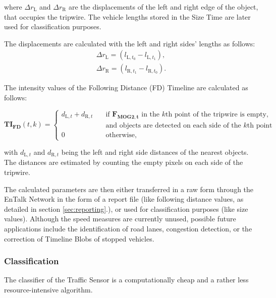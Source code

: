 where $\Delta r_{\text{L}}$ and $\Delta r_{\text{R}}$ are the displacements of the left and right edge of the object, that occupies the tripwire.
The vehicle lengths stored in the Size Time are later used for classification purposes.

The displacements are calculated with the left and right sides' lengths as follows:
\begin{gather*}
\Delta r_{\text{L}} = \left( l_{\text{L},t_0} - l_{\text{L},t_1} \right),  \\
\Delta r_{\text{R}} = \left( l_{\text{R},t_1} - l_{\text{R},t_0}\right).
\end{gather*}

The intensity values of the Following Distance (FD) Timeline are calculated as follows:

\begin{displaymath}
\boldsymbol{TI_{\text{FD}}}(t,k) = 
\begin{cases}
d_{\text{L},t} + d_{\text{R},t} 		& \quad \text{if } \boldsymbol{F_{\text{MOG2},t}} \text{ in the } k\text{th} \text{ point of the tripwire is empty,} \\ & \quad \text{and objects are detected on each side of the } k \text{th point}\\
0		& \quad \text{otherwise},
\end{cases}
\end{displaymath}

with $d_{\text{L},t}$ and $d_{\text{R},t}$ being the left and right side distances of the nearest objects.
The distances are estimated by counting the empty pixels on each side of the tripwire.

The calculated parameters are then either transferred in a raw form through the EnTalk Network in the form of a report file (like following distance values, as detailed in section \ref{sec:reporting}.), or used for classification purposes (like size values).
Although the speed measures are currently unused, possible future applications include the identification of road lanes, congestion detection, or the correction of Timeline Blobs of stopped vehicles.

\subsubsection{Classification}
The classifier of the Traffic Sensor is a computationally cheap and a rather less resource-intensive algorithm.

